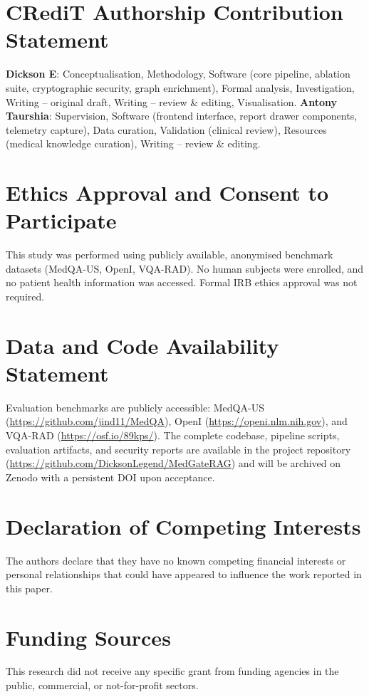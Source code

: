 \documentclass[preprint,12pt,a4paper]{elsarticle}
\begin{document}
\section*{CRediT Authorship Contribution Statement}
\textbf{Dickson E}: Conceptualisation, Methodology, Software (core pipeline,
ablation suite, cryptographic security, graph enrichment), Formal analysis,
Investigation, Writing -- original draft, Writing -- review \& editing,
Visualisation.
\textbf{Antony Taurshia}: Supervision, Software (frontend interface, report
drawer components, telemetry capture), Data curation, Validation (clinical
review), Resources (medical knowledge curation), Writing -- review \& editing.

\section*{Ethics Approval and Consent to Participate}
This study was performed using publicly available, anonymised benchmark datasets
(MedQA-US, OpenI, VQA-RAD). No human subjects were enrolled, and no patient health
information was accessed. Formal IRB ethics approval was not required.

\section*{Data and Code Availability Statement}
Evaluation benchmarks are publicly accessible: MedQA-US (\url{https://github.com/jind11/MedQA}),
OpenI (\url{https://openi.nlm.nih.gov}), and VQA-RAD (\url{https://osf.io/89kps/}).
The complete codebase, pipeline scripts, evaluation artifacts, and security reports
are available in the project repository
(\url{https://github.com/DicksonLegend/MedGateRAG})
and will be archived on Zenodo with a persistent DOI upon acceptance.

\section*{Declaration of Competing Interests}
The authors declare that they have no known competing financial interests or personal
relationships that could have appeared to influence the work reported in this paper.

\section*{Funding Sources}
This research did not receive any specific grant from funding agencies in the public,
commercial, or not-for-profit sectors.
\end{document}
